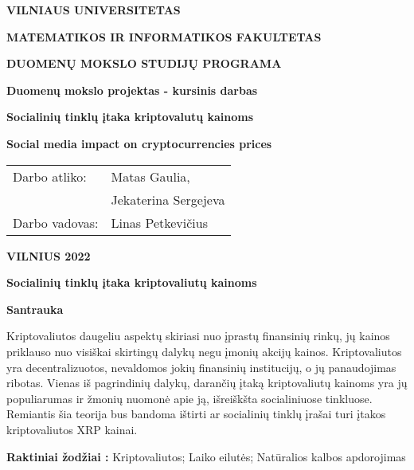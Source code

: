 \documentclass[12pt,a4paper]{article}
\begin{document}
\begin{titlepage}

\centerline{\bf \large VILNIAUS UNIVERSITETAS}
\bigskip
\centerline{\large \textbf{MATEMATIKOS IR INFORMATIKOS FAKULTETAS}}
\bigskip
\centerline{\large \textbf{DUOMENŲ MOKSLO STUDIJŲ PROGRAMA}}

\vskip 120pt
\centerline{\bf \Large \textbf{Duomenų mokslo projektas - kursinis darbas}}
\vskip 50pt
\begin{center}
    {\bf \LARGE Socialinių tinklų įtaka kriptovalutų kainoms}
\end{center}
\bigskip
\begin{center}
    {\bf \Large Social media impact on cryptocurrencies prices}
\end{center}
\bigskip

\vskip 90pt
\begin{flushright}
\begin{tabular}{ll}
Darbo atliko: & Matas Gaulia, \\
& Jekaterina Sergejeva \\
Darbo vadovas: & Linas Petkevičius
\end{tabular} 
\end{flushright}
\vskip 80pt
\centerline{\large \textbf{VILNIUS 2022}}
\end{titlepage}

\textwidth 6.5in
\textheight 9.00in

\tableofcontents
\newpage
\listoftables
\newpage
\listoffigures

\thispagestyle{empty}
\newpage


\begin{center}{\large\textbf{Socialinių tinklų įtaka kriptovaliutų kainoms}}\end{center}

\begin{small}
\vspace{2\baselineskip}
\begin{center}\textbf{Santrauka}\end{center}

Kriptovaliutos daugeliu aspektų skiriasi nuo įprastų finansinių rinkų, jų kainos priklauso nuo visiškai skirtingų dalykų negu įmonių akcijų kainos. Kriptovaliutos yra decentralizuotos, nevaldomos jokių finansinių institucijų, o jų panaudojimas ribotas. Vienas iš pagrindinių dalykų, darančių įtaką kriptovaliutų kainoms yra jų populiarumas ir žmonių nuomonė apie ją, išreiškšta socialiniuose tinkluose.
Remiantis šia teorija bus bandoma ištirti ar socialinių tinklų įrašai turi įtakos kriptovaliutos XRP kainai.
\vspace{\baselineskip}

\noindent\textbf{Raktiniai žodžiai :}
Kriptovaliutos; Laiko eilutės; Natūralios kalbos apdorojimas
\end{small}
\vspace{\baselineskip}
\thispagestyle{empty}
\end{document}
